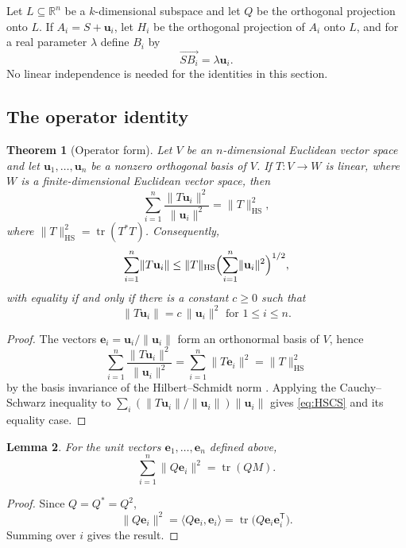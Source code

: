 \documentclass[11pt]{article}
\newtheorem{theorem}{Theorem}[section]
\newtheorem{lemma}[theorem]{Lemma}
\theoremstyle{definition}
\theoremstyle{remark}
\DeclareMathOperator{\tr}{tr}
\newcommand{\HS}{\mathrm{HS}}
\newcommand{\T}{\mathsf{T}}
\newcommand{\R}{\mathbb{R}}
\newcommand{\bu}{\mathbf u}
\newcommand{\be}{\mathbf e}
\newcommand{\norm}[1]{\lVert #1 \rVert}
\begin{document}
Let $L\subseteq\R^n$ be a $k$-dimensional subspace and let $Q$ be the orthogonal projection
onto $L$. If $A_i=S+\bu_i$, let $H_i$ be the orthogonal projection of $A_i$ onto $L$, and
for a real parameter $\lambda$ define $B_i$ by
\[
\overrightarrow{SB_i}=\lambda\bu_i.
\]
No linear independence is needed for the identities in this section.

\subsection{The operator identity}

\begin{theorem}[Operator form]\label{thm:operator}
Let $V$ be an $n$-dimensional Euclidean vector space and let
$\bu_1,\ldots,\bu_n$ be a nonzero orthogonal basis of $V$. If $T\colon V\to W$ is linear,
where $W$ is a finite-dimensional Euclidean vector space, then
\begin{equation}\label{eq:HS}
\sum_{i=1}^{n}\frac{\norm{T\bu_i}^{2}}{\norm{\bu_i}^{2}}=\norm{T}_{\HS}^{2},
\end{equation}
where $\norm{T}_{\HS}^{2}=\tr(T^{*}T)$. Consequently,
\begin{equation}\label{eq:HSCS}
\sum_{i=1}^{n}\norm{T\bu_i}
\le
\norm{T}_{\HS}\Bigl(\sum_{i=1}^{n}\norm{\bu_i}^{2}\Bigr)^{1/2},
\end{equation}
with equality if and only if there is a constant $c\ge0$ such that
\[
\norm{T\bu_i}=c\,\norm{\bu_i}^2 \text{ for } 1\le i\le n.
\]
\end{theorem}

\begin{proof}
The vectors $\be_i=\bu_i/\norm{\bu_i}$ form an orthonormal basis of $V$, hence
\[
\sum_{i=1}^{n}\frac{\norm{T\bu_i}^{2}}{\norm{\bu_i}^{2}}
=
\sum_{i=1}^{n}\norm{T\be_i}^{2}
=
\norm{T}_{\HS}^{2}
\]
by the basis invariance of the Hilbert--Schmidt norm \cite[Ch.~5]{HornJohnson}. Applying the
Cauchy--Schwarz inequality \cite{HLP} to
$\sum_i(\norm{T\bu_i}/\norm{\bu_i})\norm{\bu_i}$ gives \eqref{eq:HSCS} and its equality
case.
\end{proof}

\begin{lemma}\label{lem:trace}
For the unit vectors $\be_1,\ldots,\be_n$ defined above,
\[
\sum_{i=1}^{n}\norm{Q\be_i}^{2}=\tr(QM).
\]
\end{lemma}

\begin{proof}
Since $Q=Q^{*}=Q^2$,
\[
\norm{Q\be_i}^{2}
=
\langle Q\be_i,\be_i\rangle
=
\tr\bigl(Q\be_i\be_i^{\T}\bigr).
\]
Summing over $i$ gives the result.
\end{proof}
\end{document}
